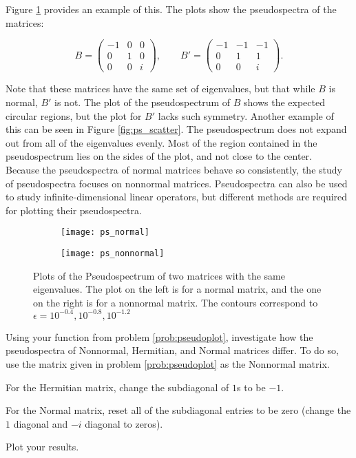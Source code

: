 Figure \ref{fig:ps_normal} provides an example of this. The plots show the pseudospectra of the matrices:

\begin{equation}
	B = \begin{pmatrix}
		-1 & 0 & 0\\
		0 & 1 & 0\\
		0 & 0 & i
	\end{pmatrix}, \qquad 	B' = \begin{pmatrix}
		-1 & -1 & -1\\
		0 & 1 & 1\\
		0 & 0 & i
	\end{pmatrix}.
\end{equation}

Note that these matrices have the same set of eigenvalues, but that while $B$ is normal, $B'$ is not. The plot of the pseudospectrum of $B$ shows the expected circular regions, but the plot for $B'$ lacks such symmetry. Another example of this can be seen in Figure \ref{fig:ps_scatter}. The pseudospectrum does not expand out from all of the eigenvalues evenly. Most of the region contained in the pseudospectrum lies on the sides of the plot, and not close to the center.\\

Because the pseudospectra of normal matrices behave so consistently, the study of pseudospectra focuses on nonnormal matrices. Pseudospectra can also be used to study infinite-dimensional linear operators, but different methods are required for plotting their pseudospectra.

\begin{figure}
\begin{center}
\begin{subfigure}[b]{.49\textwidth}
\centering
\texttt{[image: ps\_normal]}
\end{subfigure}
\begin{subfigure}[b]{.49\textwidth}
\centering
\texttt{[image: ps\_nonnormal]}
\end{subfigure}
\caption{Plots of the Pseudospectrum of two matrices with the same eigenvalues. The plot on the left is for a normal matrix, and the one on the right is for a nonnormal matrix. The contours correspond to $\epsilon=10^{-0.4},10^{-0.8},10^{-1.2}$}
\label{fig:ps_normal}
\end{center}
\end{figure}

\begin{problem}
Using your function from problem \ref{prob:pseudoplot}, investigate how the pseudospectra of Nonnormal, Hermitian, and Normal matrices differ.  To do so, use the matrix given in problem \ref{prob:pseudoplot} as the Nonnormal matrix.  

For the Hermitian matrix, change the subdiagonal of $1$s to be $-1$.  

For the Normal matrix, reset all of the subdiagonal entries to be zero (change the $1$ diagonal and $-i$ diagonal to zeros).

Plot your results.
\end{problem} 


